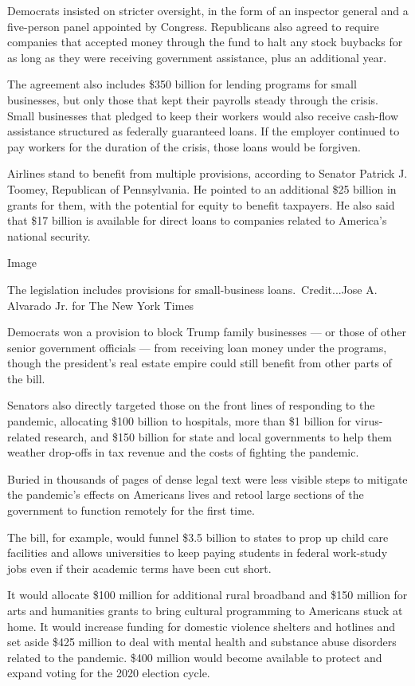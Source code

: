 Democrats insisted on stricter oversight, in the form of an inspector
general and a five-person panel appointed by Congress. Republicans also
agreed to require companies that accepted money through the fund to halt
any stock buybacks for as long as they were receiving government
assistance, plus an additional year.

The agreement also includes \$350 billion for lending programs for small
businesses, but only those that kept their payrolls steady through the
crisis. Small businesses that pledged to keep their workers would also
receive cash-flow assistance structured as federally guaranteed loans.
If the employer continued to pay workers for the duration of the crisis,
those loans would be forgiven.

Airlines stand to benefit from multiple provisions, according to Senator
Patrick J. Toomey, Republican of Pennsylvania. He pointed to an
additional \$25 billion in grants for them, with the potential for
equity to benefit taxpayers. He also said that \$17 billion is available
for direct loans to companies related to America's national security.

Image

The legislation includes provisions for small-business
loans.~Credit...Jose A. Alvarado Jr. for The New York Times

Democrats won a provision to block Trump family businesses --- or those
of other senior government officials --- from receiving loan money under
the programs, though the president's real estate empire could still
benefit from other parts of the bill.

Senators also directly targeted those on the front lines of responding
to the pandemic, allocating \$100 billion to hospitals, more than \$1
billion for virus-related research, and \$150 billion for state and
local governments to help them weather drop-offs in tax revenue and the
costs of fighting the pandemic.

Buried in thousands of pages of dense legal text were less visible steps
to mitigate the pandemic's effects on Americans lives and retool large
sections of the government to function remotely for the first time.

The bill, for example, would funnel \$3.5 billion to states to prop up
child care facilities and allows universities to keep paying students in
federal work-study jobs even if their academic terms have been cut
short.

It would allocate \$100 million for additional rural broadband and \$150
million for arts and humanities grants to bring cultural programming to
Americans stuck at home. It would increase funding for domestic violence
shelters and hotlines and set aside \$425 million to deal with mental
health and substance abuse disorders related to the pandemic. \$400
million would become available to protect and expand voting for the 2020
election cycle.

